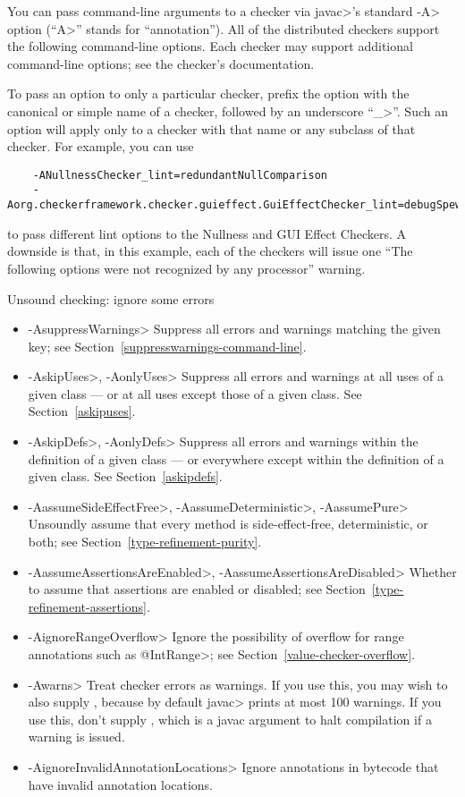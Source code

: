 You can pass command-line arguments to a checker via \<javac>'s standard \<-A>
option (``\<A>'' stands for ``annotation'').  All of the distributed
checkers support the following command-line options.
Each checker may support additional command-line options; see the checker's
documentation.

To pass an option to only a particular checker,
prefix the option with the canonical or simple name
of a checker, followed by an underscore ``\<\_>''.
Such an option will apply only to a checker with that name or any subclass of that checker.
For example, you can use
\begin{Verbatim}
    -ANullnessChecker_lint=redundantNullComparison
    -Aorg.checkerframework.checker.guieffect.GuiEffectChecker_lint=debugSpew
\end{Verbatim}

\noindent
to pass different lint options to the Nullness and GUI Effect Checkers.  A
downside is that, in this example, each of the checkers will issue one
``The following options were not recognized by any processor'' warning.


Unsound checking: ignore some errors
\begin{itemize}
\item \<-AsuppressWarnings>
  Suppress all errors and warnings matching the given key; see
  Section~\ref{suppresswarnings-command-line}.
\item \<-AskipUses>, \<-AonlyUses>
  Suppress all errors and warnings at all uses of a given class --- or at all
  uses except those of a given class.  See Section~\ref{askipuses}.
\item \<-AskipDefs>, \<-AonlyDefs>
  Suppress all errors and warnings within the definition of a given class
  --- or everywhere except within the definition of a given class.  See
  Section~\ref{askipdefs}.
\item \<-AassumeSideEffectFree>, \<-AassumeDeterministic>, \<-AassumePure>
  Unsoundly assume that every method is side-effect-free, deterministic, or
  both; see
  Section~\ref{type-refinement-purity}.
\item \<-AassumeAssertionsAreEnabled>, \<-AassumeAssertionsAreDisabled>
  Whether to assume that assertions are enabled or disabled; see Section~\ref{type-refinement-assertions}.
\item \<-AignoreRangeOverflow>
  Ignore the possibility of overflow for range annotations such as
  \<@IntRange>; see Section~\ref{value-checker-overflow}.
\item \<-Awarns>
  Treat checker errors as warnings.  If you use this, you may wish to also
  supply , because by default \<javac> prints at
  most 100 warnings.  If you use this, don't supply ,
  which is a javac argument to halt compilation if a warning is issued.
\item \<-AignoreInvalidAnnotationLocations>
  Ignore annotations in bytecode that have invalid annotation locations.
\end{itemize}

